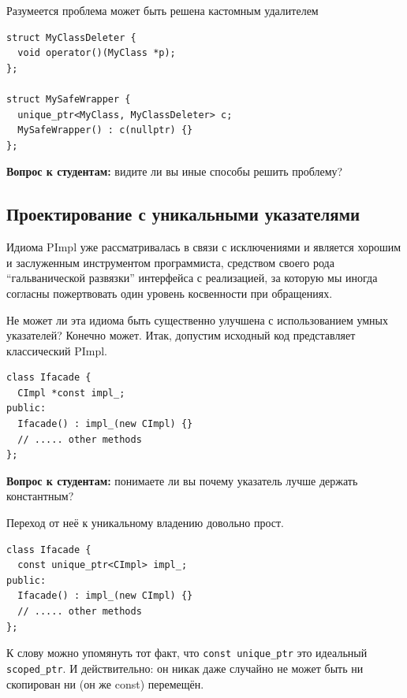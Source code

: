 \documentclass[a4paper,12pt,oneside]{book}
\newif\ifanswers
\begin{document}
Разумеется проблема может быть решена кастомным удалителем

\begin{lstlisting}
struct MyClassDeleter {
  void operator()(MyClass *p);
};

struct MySafeWrapper { 
  unique_ptr<MyClass, MyClassDeleter> c; 
  MySafeWrapper() : c(nullptr) {}
};
\end{lstlisting}

\textbf{Вопрос к студентам:} видите ли вы иные способы решить проблему?
\ifanswers
Правильный ответ: да, например не определять конструктор в хедере.
\fi

\subsection{Проектирование с уникальными указателями}\label{subsub:uniquetrees}

Идиома PImpl уже рассматривалась в связи с исключениями и является хорошим и заслуженным инструментом программиста, средством своего рода ``гальванической развязки'' интерфейса с реализацией, за которую мы иногда согласны пожертвовать один уровень косвенности при обращениях.

Не может ли эта идиома быть существенно улучшена с использованием умных указателей? Конечно может. Итак, допустим исходный код представляет классический PImpl.

\begin{lstlisting}
class Ifacade {
  CImpl *const impl_;
public:
  Ifacade() : impl_(new CImpl) {}  
  // ..... other methods
};
\end{lstlisting}

\textbf{Вопрос к студентам:} понимаете ли вы почему указатель лучше держать константным?

\ifanswers
Правильный ответ: например чтобы не забыть его инициализировать и чтобы заблокировать всякие копирующие и прочие конструкторы по умолчанию
\fi

Переход от неё к уникальному владению довольно прост.

\begin{lstlisting}
class Ifacade {
  const unique_ptr<CImpl> impl_;
public:
  Ifacade() : impl_(new CImpl) {}
  // ..... other methods
};
\end{lstlisting}

К слову можно упомянуть тот факт, что \lstinline!const unique_ptr! это идеальный \lstinline!scoped_ptr!. И действительно: он никак даже случайно не может быть ни скопирован ни (он же const) перемещён.
\end{document}
